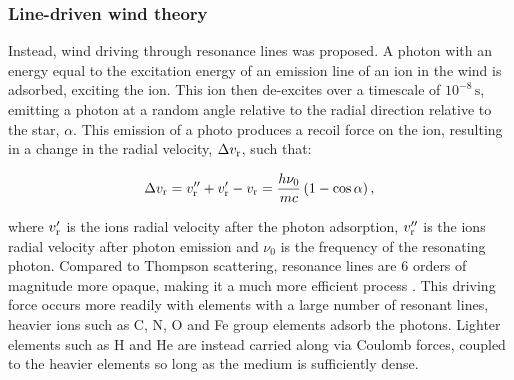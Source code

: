 \subsubsection{Line-driven wind theory}
\label{sec:cak}

Instead, wind driving through resonance lines was proposed.
A photon with an energy equal to the excitation energy of an emission line of an ion in the wind is adsorbed, exciting the ion.
This ion then de-excites over a timescale of $10^{-8} \, \si{\second}$, emitting a photon at a random angle relative to the radial direction relative to the star, $\alpha$.
This emission of a photo produces a recoil force on the ion, resulting in a change in the radial velocity, $\Delta v_\text{r}$, such that:

\begin{equation}
  \Delta v_\text{r} = v_\text{r}'' + v_\text{r}' - v_\text{r} = \frac{h\nu_0}{mc} \left(1-\cos \alpha \right),
\end{equation}

\noindent
where $v_\text{r}'$ is the ions radial velocity after the photon adsorption, $v_\text{r}''$ is the ions radial velocity after photon emission and $\nu_0$ is the frequency of the resonating photon.
Compared to Thompson scattering, resonance lines are 6 orders of magnitude more opaque, making it a much more efficient process
\parencite[Ch.~8]{lamersIntroductionStellarWinds1999}.
This driving force occurs more readily with elements with a large number of resonant lines, heavier ions such as C, N, O and Fe group elements adsorb the photons.
Lighter elements such as H and He are instead carried along via Coulomb forces, coupled to the heavier elements so long as the medium is sufficiently dense.

